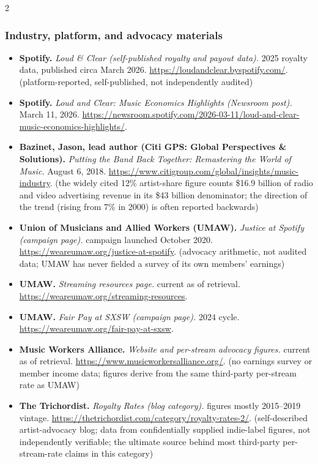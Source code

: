 {\begin{multicols}{2}
\subsubsection*{Industry, platform, and advocacy materials}
\begin{itemize}[itemsep=0pt,topsep=1pt,parsep=0pt,partopsep=0pt,leftmargin=1em]
\item \textbf{Spotify.} \textit{Loud \& Clear (self-published royalty and payout data).} 2025 royalty data, published circa March 2026. \url{https://loudandclear.byspotify.com/}. {\color{ammuted}(platform-reported, self-published, not independently audited)}
\item \textbf{Spotify.} \textit{Loud and Clear: Music Economics Highlights (Newsroom post).} March 11, 2026. \url{https://newsroom.spotify.com/2026-03-11/loud-and-clear-music-economics-highlights/}.
\item \textbf{Bazinet, Jason, lead author (Citi GPS: Global Perspectives \& Solutions).} \textit{Putting the Band Back Together: Remastering the World of Music.} August 6, 2018. \url{https://www.citigroup.com/global/insights/music-industry}. {\color{ammuted}(the widely cited 12\% artist-share figure counts \$16.9 billion of radio and video advertising revenue in its \$43 billion denominator; the direction of the trend (rising from 7\% in 2000) is often reported backwards)}
\item \textbf{Union of Musicians and Allied Workers (UMAW).} \textit{Justice at Spotify (campaign page).} campaign launched October 2020. \url{https://weareumaw.org/justice-at-spotify}. {\color{ammuted}(advocacy arithmetic, not audited data; UMAW has never fielded a survey of its own members’ earnings)}
\item \textbf{UMAW.} \textit{Streaming resources page.} current as of retrieval. \url{https://weareumaw.org/streaming-resources}.
\item \textbf{UMAW.} \textit{Fair Pay at SXSW (campaign page).} 2024 cycle. \url{https://weareumaw.org/fair-pay-at-sxsw}.
\item \textbf{Music Workers Alliance.} \textit{Website and per-stream advocacy figures.} current as of retrieval. \url{https://www.musicworkersalliance.org/}. {\color{ammuted}(no earnings survey or member income data; figures derive from the same third-party per-stream rate as UMAW)}
\item \textbf{The Trichordist.} \textit{Royalty Rates (blog category).} figures mostly 2015--2019 vintage. \url{https://thetrichordist.com/category/royalty-rates-2/}. {\color{ammuted}(self-described artist-advocacy blog; data from confidentially supplied indie-label figures, not independently verifiable; the ultimate source behind most third-party per-stream-rate claims in this category)}

\end{itemize}
\end{multicols}}
